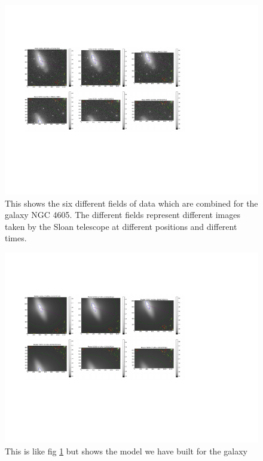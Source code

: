 \documentclass[12pt,preprint,pdftex]{aastex}
\begin{document}
\begin{figure}
\centering
\includegraphics[trim = 1cm 3.2cm 3.8cm 2.15cm,clip=true,width=\textwidth] {data.pdf}
\caption{This shows the six different fields of data which are combined for the galaxy NGC 4605. The different fields represent different images taken by the Sloan telescope at different positions and different times.}
\label{fig:4605data}
\end{figure}
\begin{figure}
\centering
\includegraphics[trim = 1cm 3.2cm 3.8cm 2.15cm,clip=true,width=\textwidth] {model.pdf}
\caption{This is like fig \ref{fig:4605data} but shows the model we have built for the galaxy}
\label{fig:4605model}
\end{figure}
\end{document}
